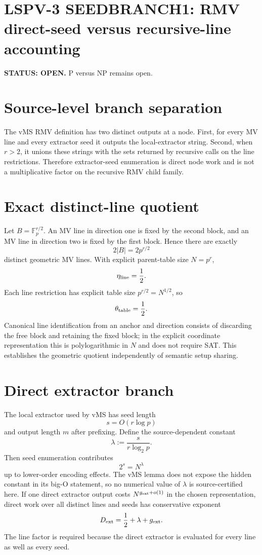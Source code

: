 \documentclass[11pt]{article}
\begin{document}
\section*{LSPV-3 SEEDBRANCH1: RMV direct-seed versus recursive-line accounting}
\textbf{STATUS: OPEN.} P versus NP remains open.
\section*{Source-level branch separation}
The vMS RMV definition has two distinct outputs at a node. First, for every MV line and every extractor seed it outputs the local-extractor string. Second, when $r>2$, it unions these strings with the sets returned by recursive calls on the line restrictions. Therefore extractor-seed enumeration is direct node work and is not a multiplicative factor on the recursive RMV child family.
\section*{Exact distinct-line quotient}
Let $B=\mathbb F_p^{r/2}$. An MV line in direction one is fixed by the second block, and an MV line in direction two is fixed by the first block. Hence there are exactly
\[
2|B|=2p^{r/2}
\]
distinct geometric MV lines. With explicit parent-table size $N=p^r$,
\[
\eta_{\rm line}=\frac12.
\]
Each line restriction has explicit table size $p^{r/2}=N^{1/2}$, so
\[
\theta_{\rm table}=\frac12.
\]
Canonical line identification from an anchor and direction consists of discarding the free block and retaining the fixed block; in the explicit coordinate representation this is polylogarithmic in $N$ and does not require SAT. This establishes the geometric quotient independently of semantic setup sharing.
\section*{Direct extractor branch}
The local extractor used by vMS has seed length
\[
s=O(r\log p)
\]
and output length $m$ after prefixing. Define the source-dependent constant
\[
\lambda:=\frac{s}{r\log_2p}.
\]
Then seed enumeration contributes
\[
2^s=N^{\lambda}
\]
up to lower-order encoding effects. The vMS lemma does not expose the hidden constant in its big-O statement, so no numerical value of $\lambda$ is source-certified here.
If one direct extractor output costs $N^{g_{\rm ext}+o(1)}$ in the chosen representation, direct work over all distinct lines and seeds has conservative exponent
\[
D_{\rm ext}=\frac12+\lambda+g_{\rm ext}.
\]
The line factor is required because the direct extractor is evaluated for every line as well as every seed.
\end{document}
